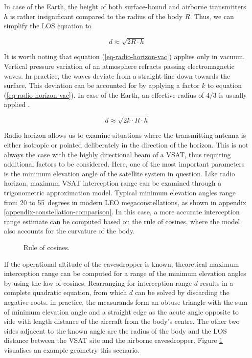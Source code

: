 \documentclass[english, 12pt, a4paper, elec, utf8, a-1b, online]{aaltothesis}
\begin{document}
In case of the Earth, the height of both surface-bound and airborne transmitters $h$ is rather insignificant compared to the radius of the body $R$. Thus, we can simplify the LOS equation to

\begin{equation} \label{eq-radio-horizon-vac}
  d \approx \sqrt{2R \cdot h}
\end{equation}

It is worth noting that equation (\ref{eq-radio-horizon-vac}) applies only in vacuum.
Vertical pressure variation of an atmosphere refracts passing electromagnetic waves. In practice, the waves deviate from a straight line down towards the surface. This deviation can be accounted for by applying a factor $k$ to equation (\ref{eq-radio-horizon-vac}). In case of the Earth, an effective radius of $4/3$ is usually applied \cite{seybold2005introduction}.

\begin{equation} \label{eq-radio-horizon-ath}
  d \approx \sqrt{2 k \cdot R \cdot h}
\end{equation}

Radio horizon allows us to examine situations where the transmitting antenna is either isotropic or pointed deliberately in the direction of the horizon.
This is not always the case with the highly directional beam of a VSAT, thus requiring additional factors to be considered.
Here, one of the most important parameters is the minimum elevation angle of the satellite system in question.
Like radio horizon, maximum VSAT interception range can be examined through a trigonometric approximation model.
Typical minimum elevation angles range from 20 to 55~degrees in modern LEO megaconstellations, as shown in appendix \ref{appendix-constellation-comparison}.
In this case, a more accurate interception range estimate can be computed based on the rule of cosines, where the model also accounts for the curvature of the body.

\begin{figure}[h]
  \centering
  
  \caption{Rule of cosines.}
  \label{fig-cosine-rule-interception}
\end{figure}

If the operational altitude of the eavesdropper is known, theoretical maximum interception range can be computed for a range of the minimum elevation angles by using the law of cosines.
Rearranging for interception range $d$ results in a complete quadratic equation, from which $d$ can be solved by discarding the negative roots.
in practice, the measurands form an obtuse triangle with the sum of minimum elevation angle and a straight edge as the acute angle opposite to side with length distance of the aircraft from the body's centre. %
The other two sides adjacent to the known angle are the radius of the body and the LOS distance between the VSAT site and the airborne eavesdropper.
Figure \ref{fig-cosine-rule-interception} visualises an example geometry this scenario.
\end{document}

